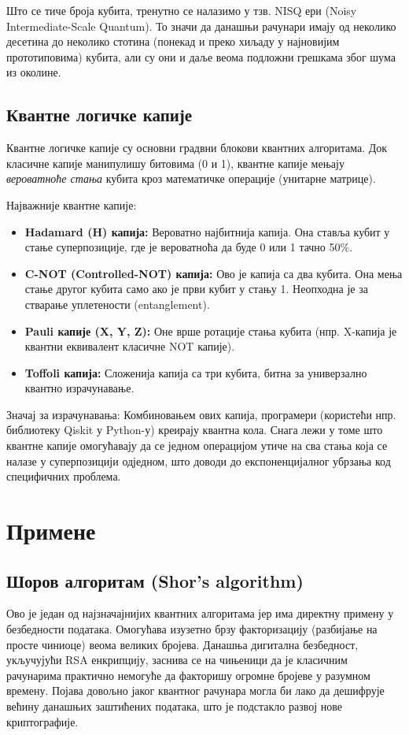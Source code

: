 \documentclass[12pt]{article}
\theoremstyle{plain}
\theoremstyle{definition}
\begin{document}
	Што се тиче броја кубита, тренутно се налазимо у тзв. NISQ ери (Noisy Intermediate-Scale Quantum). То значи да данашњи рачунари имају од неколико десетина до неколико стотина (понекад и преко хиљаду у најновијим прототиповима) кубита, али су они и даље веома подложни грешкама због шума из околине.
	
	\subsection{Квантне логичке капије}
	Квантне логичке капије су основни градвни блокови квантних алгоритама. Док класичне капије манипулишу битовима (0 и 1), квантне капије мењају \textit{вероватноће стања} кубита кроз математичке операције (унитарне матрице).
	
	Најважније квантне капије:
	
	\begin{itemize}
		\item \textbf{Hadamard (H) капија:} Вероватно најбитнија капија. Она ставља кубит у стање суперпозиције, где је вероватноћа да буде 0 или 1 тачно 50\%.
		\item \textbf{C-NOT (Controlled-NOT) капија:} Ово је капија са два кубита. Она мења стање другог кубита само ако је први кубит у стању 1. Неопходна је за стварање уплетености (entanglement).
		\item \textbf{Pauli капије (X, Y, Z):} Оне врше ротације стања кубита (нпр. X-капија је квантни еквивалент класичне NOT капије).
		\item \textbf{Toffoli капија:} Сложенија капија са три кубита, битна за универзално квантно израчунавање.
	\end{itemize}
	
	Значај за израчунавања: Комбиновањем ових капија, програмери (користећи нпр. библиотеку Qiskit у Python-у) креирају квантна кола. Снага лежи у томе што квантне капије омогућавају да се једном операцијом утиче на сва стања која се налазе у суперпозицији одједном, што доводи до експоненцијалног убрзања код специфичних проблема.
	
	\section{Примене}
	
	\subsection{Шоров алгоритам (Shor's algorithm)}
	Ово је један од најзначајнијих квантних алгоритама јер има директну примену у безбедности података. Омогућава изузетно брзу факторизацију (разбијање на просте чиниоце) веома великих бројева. Данашња дигитална безбедност, укључујући RSA енкрипцију, заснива се на чињеници да је класичним рачунарима практично немогуће да факторишу огромне бројеве у разумном времену. Појава довољно јаког квантног рачунара могла би лако да дешифрује већину данашњих заштићених података, што је подстакло развој нове криптографије.
	
\end{document}
